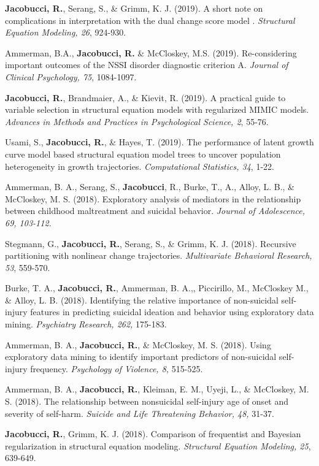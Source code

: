 \documentclass[letterpaper,10pt]{article}
\begin{document}
\begin{etaremune}
	\item  \textbf{Jacobucci, R.}, Serang, S., \& Grimm, K. J. (2019). A short note on complications in interpretation with the dual change score model . \emph{Structural Equation Modeling, 26}, 924-930.
	\item  Ammerman, B.A., \textbf{Jacobucci, R.} \& McCloskey, M.S. (2019). Re-considering important outcomes of the NSSI disorder diagnostic criterion A. \emph{Journal of Clinical Psychology, 75}, 1084-1097.
	\item  \textbf{Jacobucci, R.}, Brandmaier, A., \& Kievit, R. (2019). A practical guide to variable selection in structural equation models with regularized MIMIC models. \emph{Advances in Methods and Practices in Psychological Science, 2}, 55-76.  
	\item  Usami, S., \textbf{Jacobucci, R.}, \& Hayes, T. (2019). The performance of latent growth curve model based structural equation model trees to uncover population heterogeneity in growth trajectories. \emph{Computational Statistics, 34}, 1-22.
	\item Ammerman, B. A., Serang, S., \textbf{Jacobucci}, R., Burke, T., A., Alloy, L. B., \& McCloskey, M. S. (2018). Exploratory analysis of mediators in the relationship between childhood maltreatment and suicidal behavior. \emph{Journal of Adolescence, 69, 103-112.}
	\item Stegmann, G., \textbf{Jacobucci, R.}, Serang, S., \& Grimm, K. J. (2018). Recursive partitioning with nonlinear change trajectories. \emph{Multivariate Behavioral Research, 53}, 559-570.
	\item Burke, T. A., \textbf{Jacobucci, R.}, Ammerman, B. A.,, Piccirillo, M., McCloskey M., \& Alloy, L. B. (2018). Identifying the relative importance of non-suicidal self-injury features in predicting suicidal ideation and behavior using exploratory data mining. \emph{Psychiatry Research, 262,} 175-183.
	\item Ammerman, B. A., \textbf{Jacobucci, R.}, \& McCloskey, M. S. (2018). Using exploratory data mining to identify important predictors of non-suicidal self-injury frequency. \emph{Psychology of Violence, 8,} 515-525.
	\item Ammerman, B. A., \textbf{Jacobucci, R.}, Kleiman, E. M., Uyeji, L., \& McCloskey, M. S. (2018). The relationship between nonsuicidal self-injury age of onset and severity of self-harm. \emph{Suicide and Life Threatening Behavior, 48,} 31-37.
	\item  \textbf{Jacobucci, R.}, Grimm, K. J. (2018). Comparison of frequentist and Bayesian regularization in structural equation modeling. \emph{Structural Equation Modeling, 25}, 639-649.

\end{etaremune}
\end{document}
